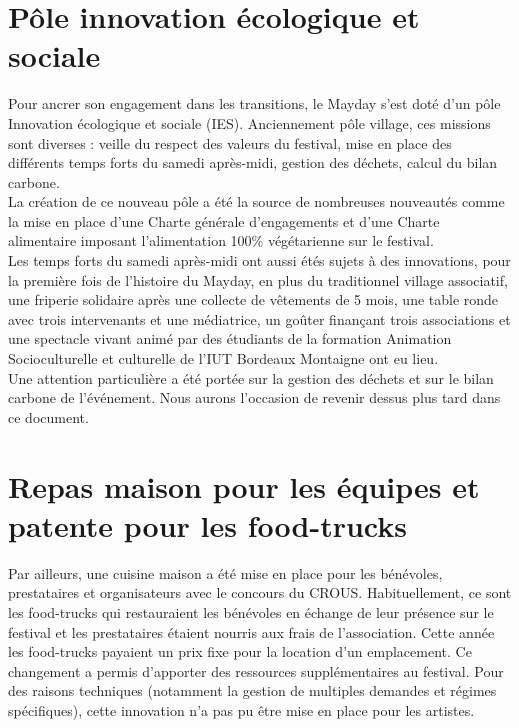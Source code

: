 \documentclass[12pt,a4paper]{report}
\begin{document}
\section{Pôle innovation écologique et sociale}
Pour ancrer son engagement dans les transitions, le Mayday s’est doté d’un pôle Innovation écologique et sociale (IES). Anciennement pôle village, ces missions sont diverses : veille du respect des valeurs du festival, mise en place des différents temps forts du samedi après-midi, gestion des déchets, calcul du bilan carbone.\\

La création de ce nouveau pôle a été la source de nombreuses nouveautés comme la mise en place d’une Charte générale d’engagements et d’une Charte alimentaire imposant l'alimentation 100\% végétarienne sur le festival.\\

Les temps forts du samedi après-midi ont aussi étés sujets à des innovations, pour la première fois de l’histoire du Mayday, en plus du traditionnel village associatif, une friperie solidaire après une collecte de vêtements de 5 mois, une table ronde avec trois intervenants et une médiatrice, un goûter finançant trois associations et une spectacle vivant animé par des étudiants de la formation Animation Socioculturelle et culturelle de l’IUT Bordeaux Montaigne ont eu lieu.\\

Une attention particulière a été portée sur la gestion des déchets et sur le bilan carbone de l’événement. Nous aurons l’occasion de revenir dessus plus tard dans ce document.

\section{Repas maison pour les équipes et patente pour les food-trucks}
Par ailleurs, une cuisine maison a été mise en place pour les bénévoles, prestataires et organisateurs avec le concours du CROUS. Habituellement, ce sont les food-trucks qui restauraient les bénévoles en échange de leur présence sur le festival et les prestataires étaient nourris aux frais de l’association. Cette année les food-trucks payaient un prix fixe pour la location d'un emplacement. Ce changement a permis d’apporter des ressources supplémentaires au festival. Pour des raisons techniques (notamment la gestion de multiples demandes et régimes spécifiques), cette innovation n'a pas pu être mise en place pour les artistes.
\end{document}
